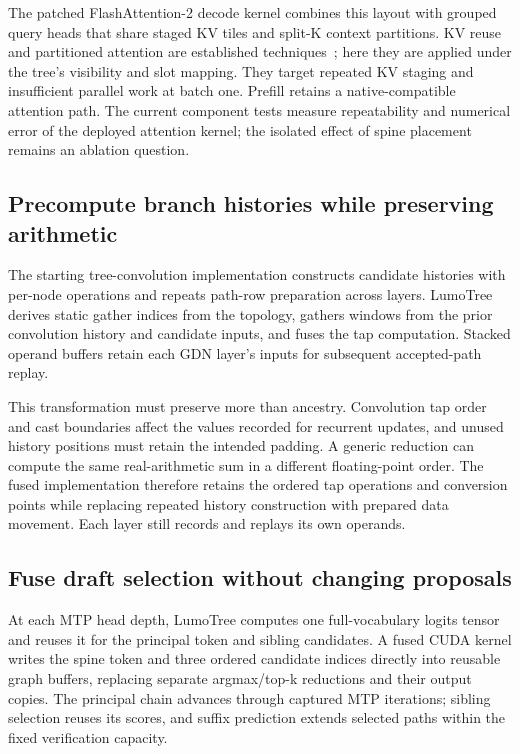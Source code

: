 \documentclass[conference]{IEEEtran}
\newcommand{\sys}{LumoTree}
\begin{document}
The patched FlashAttention-2 decode kernel combines this layout with grouped query heads that share staged KV tiles and split-K context partitions. KV reuse and partitioned attention are established techniques~\cite{yao2024deft,pan2025fasttree}; here they are applied under the tree's visibility and slot mapping. They target repeated KV staging and insufficient parallel work at batch one. Prefill retains a native-compatible attention path. The current component tests measure repeatability and numerical error of the deployed attention kernel; the isolated effect of spine placement remains an ablation question.

\subsection{Precompute branch histories while preserving arithmetic}
The starting tree-convolution implementation constructs candidate histories with per-node operations and repeats path-row preparation across layers. \sys{} derives static gather indices from the topology, gathers windows from the prior convolution history and candidate inputs, and fuses the tap computation. Stacked operand buffers retain each GDN layer's inputs for subsequent accepted-path replay.

This transformation must preserve more than ancestry. Convolution tap order and cast boundaries affect the values recorded for recurrent updates, and unused history positions must retain the intended padding. A generic reduction can compute the same real-arithmetic sum in a different floating-point order. The fused implementation therefore retains the ordered tap operations and conversion points while replacing repeated history construction with prepared data movement. Each layer still records and replays its own operands.

\subsection{Fuse draft selection without changing proposals}
At each MTP head depth, \sys{} computes one full-vocabulary logits tensor and reuses it for the principal token and sibling candidates. A fused CUDA kernel writes the spine token and three ordered candidate indices directly into reusable graph buffers, replacing separate argmax/top-k reductions and their output copies. The principal chain advances through captured MTP iterations; sibling selection reuses its scores, and suffix prediction extends selected paths within the fixed verification capacity.
\end{document}
